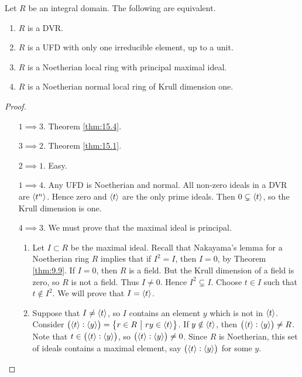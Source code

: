 \pagebreak

\begin{theorem}
\label{thm:15.5}
Let $ R $ be an integral domain. The following are equivalent.
\begin{enumerate}
\item $ R $ is a DVR.
\item $ R $ is a UFD with only one irreducible element, up to a unit.
\item $ R $ is a Noetherian local ring with principal maximal ideal.
\item $ R $ is a Noetherian normal local ring of Krull dimension one.
\end{enumerate}
\end{theorem}

\begin{proof}
\hfill
\begin{itemize}[leftmargin=0.5in]
\item[$ 1 \implies 3 $.] Theorem \ref{thm:15.4}.
\item[$ 3 \implies 2 $.] Theorem \ref{thm:15.1}.
\item[$ 2 \implies 1 $.] Easy.
\item[$ 1 \implies 4 $.] Any UFD is Noetherian and normal. All non-zero ideals in a DVR are $ \left\langle t^n \right\rangle $. Hence zero and $ \left\langle t \right\rangle $ are the only prime ideals. Then $ 0 \subsetneq \left\langle t \right\rangle $, so the Krull dimension is one.
\item[$ 4 \implies 3 $.] We must prove that the maximal ideal is principal.
\begin{enumerate}[label=Step \arabic*.]
\item Let $ I \subset R $ be the maximal ideal. Recall that Nakayama's lemma for a Noetherian ring $ R $ implies that if $ I^2 = I $, then $ I = 0 $, by Theorem \ref{thm:9.9}. If $ I = 0 $, then $ R $ is a field. But the Krull dimension of a field is zero, so $ R $ is not a field. Thus $ I \ne 0 $. Hence $ I^2 \subsetneq I $. Choose $ t \in I $ such that $ t \notin I^2 $. We will prove that $ I = \left\langle t \right\rangle $.
\item Suppose that $ I \ne \left\langle t \right\rangle $, so $ I $ contains an element $ y $ which is not in $ \left\langle t \right\rangle $. Consider $ \br{\abr{t} : \abr{y}} = \cbr{r \in R \st ry \in \abr{t}} $. If $ y \notin \left\langle t \right\rangle $, then $ \br{\abr{t} : \abr{y}} \ne R $. Note that $ t \in \br{\abr{t} : \abr{y}} $, so $ \br{\abr{t} : \abr{y}} \ne 0 $. Since $ R $ is Noetherian, this set of ideals contains a maximal element, say $ \br{\abr{t} : \abr{y}} $ for some $ y $.

\end{enumerate}
\end{itemize}
\end{proof}
